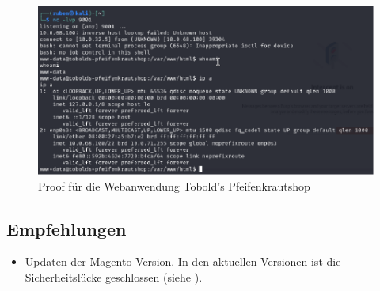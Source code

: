 \begin{figure}[!ht]
    \centering
    \includegraphics[width=\linewidth]{images/proofs/07_pfeifenkraut_shop_proof.png}
    \caption{Proof für die Webanwendung Tobold's Pfeifenkrautshop}
    \label{fig:07_pfeifenkraut_shop_proof}
\end{figure}

\subsection*{Empfehlungen}
\begin{itemize}
    \item Updaten der Magento-Version. In den aktuellen Versionen ist die Sicherheitslücke geschlossen (siehe \cite{owaspVulnerableDependency}).
    
\end{itemize}